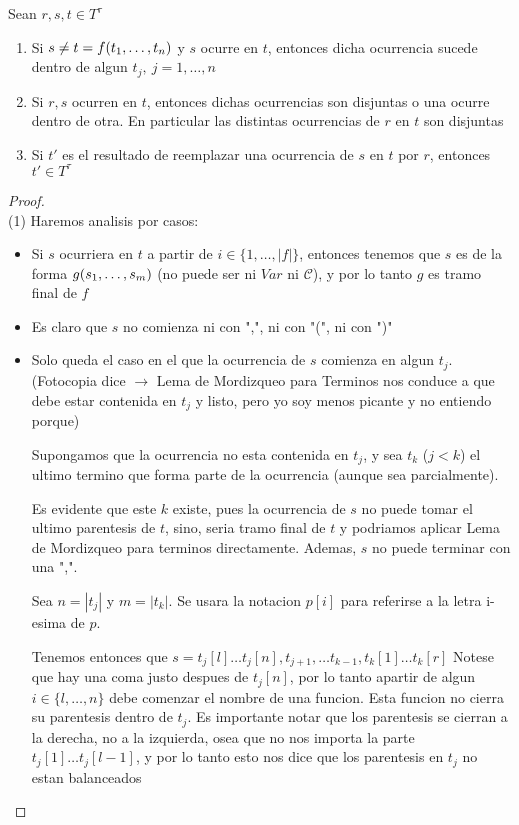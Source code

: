 \begin{lemma}
  Sean $r, s, t \in T^\tau$
  \begin{enumerate}
    \item Si $s \neq t = f(t_{1}, \dots, t_{n})$ y $s$ ocurre en $t$, entonces dicha ocurrencia sucede dentro de algun $t_j,\ j = 1, \dots, n$
    \item Si $r, s$ ocurren en $t$, entonces dichas ocurrencias son disjuntas o una ocurre dentro de otra. En particular las distintas ocurrencias de $r$ en $t$ son disjuntas
    \item Si $t'$ es el resultado de reemplazar una ocurrencia de $s$ en $t$ por $r$, entonces $t' \in T^\tau$
  \end{enumerate}
\end{lemma}
\begin{proof}
  $ $\\
  (1) Haremos analisis por casos:
  \begin{itemize}
    \item Si $s$ ocurriera en $t$ a partir de $i\in\{1,\dots,|f|\}$, entonces tenemos que $s$ es de la forma $g(s_{1}, \dots, s_{m})$ (no puede ser ni $Var$ ni $\mathcal{C}$), y por lo tanto $g$ es tramo final de $f$ \abs
    \item Es claro que $s$ no comienza ni con ",", ni con "(", ni con ")"
    \item 
    Solo queda el caso en el que la ocurrencia de $s$ comienza en algun $t_j$. (Fotocopia dice $\rightarrow$ Lema de Mordizqueo para Terminos nos conduce a que debe estar contenida en $t_j$ y listo, pero yo soy menos picante y no entiendo porque)
    
    Supongamos que la ocurrencia no esta contenida en $t_j$, y sea $t_k$ ($j<k$) el ultimo termino que forma parte de la ocurrencia (aunque sea parcialmente).
    
    Es evidente que este $k$ existe, pues la ocurrencia de $s$ no puede tomar el ultimo parentesis de $t$, sino, seria tramo final de $t$ y podriamos aplicar Lema de Mordizqueo para terminos directamente. Ademas, $s$ no puede terminar con una ",".
    
    Sea $n=|t_j|$ y $m=|t_k|$. Se usara la notacion $p[i]$ para referirse a la letra i-esima de $p$.

    Tenemos entonces que $s=t_j[l]\dots t_j[n],t_{j+1},\dots t_{k-1},t_k[1]\dots t_k[r]$
    Notese que hay una coma justo despues de $t_j[n]$, por lo tanto apartir de algun $i\in\{l,\dots,n\}$ debe comenzar el nombre de una funcion.
    Esta funcion no cierra su parentesis dentro de $t_j$. Es importante notar que los parentesis se cierran a la derecha, no a la izquierda, osea que no nos importa 
    la parte $t_j[1]\dots t_j[l-1]$, y por lo tanto esto nos dice que los parentesis en $t_j$ no estan balanceados \abs
  \end{itemize}


\end{proof}
